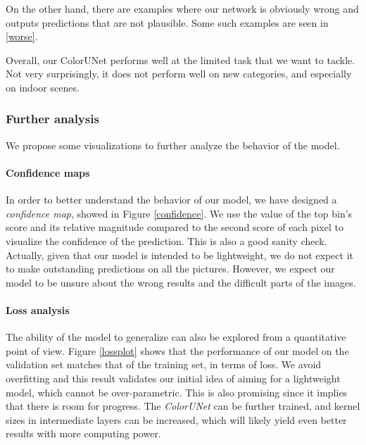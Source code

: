 \documentclass[10pt,twocolumn,letterpaper]{article}
\begin{document}
On the other hand, there are examples where our network is obviously wrong and outputs predictions that are not plausible. Some such examples are seen in \ref{worse}.

Overall, our ColorUNet performs well at the limited task that we want to tackle. Not very surprisingly, it does not perform well on new categories, and especially on indoor scenes.

\subsubsection{Further analysis}

We propose some visualizations to further analyze the behavior of the model.  

\paragraph{Confidence maps}


In order to better understand the behavior of our model, we have designed a \textit{confidence map}, showed in Figure \ref{confidence}. We use the value of the top bin's score and its relative magnitude compared to the second score of each pixel to visualize the confidence of the prediction. This is also a good sanity check. Actually, given that our model is intended to be lightweight, we do not expect it to make outstanding predictions on all the pictures. However, we expect our model to be unsure about the wrong results and the difficult parts of the images.




\paragraph{Loss analysis}


The ability of the model to generalize can also be explored from a quantitative point of view. Figure \ref{lossplot} shows that the performance of our model on the validation set matches that of the training set, in terms of loss. We avoid overfitting and this result validates our initial idea of aiming for a lightweight model, which cannot be over-parametric. This is also promising since it implies that there is room for progress. The \textit{ColorUNet} can be further trained, and kernel sizes in intermediate layers can be increased, which will likely yield even better results with more computing power.
\end{document}
